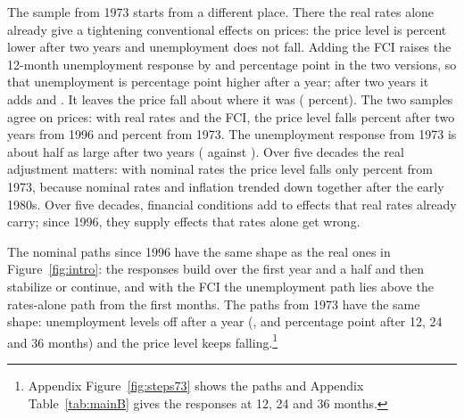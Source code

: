 \documentclass[11pt]{article}
\begin{document}
The sample from 1973 starts from a different place. There the real rates alone already give a tightening conventional effects on prices: the price level is  percent lower after two years and unemployment does not fall. Adding the FCI raises the 12-month unemployment response by  and  percentage point in the two versions, so that unemployment is  percentage point higher after a year; after two years it adds  and . It leaves the price fall about where it was ( percent). The two samples agree on prices: with real rates and the FCI, the price level falls  percent after two years from 1996 and  percent from 1973. The unemployment response from 1973 is about half as large after two years ( against ). Over five decades the real adjustment matters: with nominal rates the price level falls only  percent from 1973, because nominal rates and inflation trended down together after the early 1980s. Over five decades, financial conditions add to effects that real rates already carry; since 1996, they supply effects that rates alone get wrong.

The nominal paths since 1996 have the same shape as the real ones in Figure~\ref{fig:intro}: the responses build over the first year and a half and then stabilize or continue, and with the FCI the unemployment path lies above the rates-alone path from the first months. The paths from 1973 have the same shape: unemployment levels off after a year (,  and  percentage point after 12, 24 and 36 months) and the price level keeps falling.\footnote{Appendix Figure~\ref{fig:steps73} shows the paths and Appendix Table~\ref{tab:mainB} gives the responses at 12, 24 and 36 months.}
\end{document}
